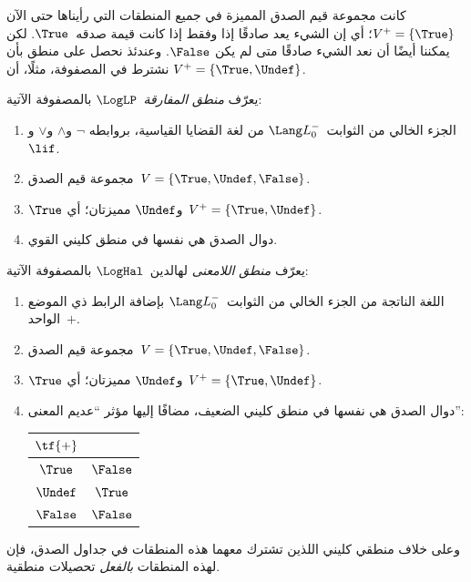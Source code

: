 \documentclass[../../../include/open-logic-section]{subfiles}
\begin{document}


كانت مجموعة قيم الصدق المميزة في جميع المنطقات التي رأيناها حتى الآن
$V^+ = \{\True\}$؛ أي إن الشيء يعد صادقًا إذا وفقط إذا كانت قيمة
صدقه~$\True$. لكن يمكننا أيضًا أن نعد الشيء صادقًا متى لم يكن
$\False$. وعندئذ نحصل على منطق بأن نشترط في المصفوفة، مثلًا، أن
$V^+ = \{\True, \Undef\}$.

\begin{defn}
يعرّف \emph{منطق المفارقة}~$\LogLP$ بالمصفوفة الآتية:
\begin{enumerate}
  \item الجزء الخالي من الثوابت~$\Lang L_0^{-}$ من لغة القضايا القياسية، بروابطه
  $\lnot$ و$\land$ و$\lor$ و$\lif$.
  \item مجموعة قيم الصدق~$V = \{\True, \Undef, \False\}$.
  \item $\True$ و$\Undef$ مميزتان؛ أي~$V^+ = \{\True, \Undef\}$.
  \item دوال الصدق هي نفسها في منطق كليني القوي.
\end{enumerate}
\end{defn}

\begin{defn}
يعرّف \emph{منطق اللامعنى} لهالدين~$\LogHal$ بالمصفوفة الآتية:
\begin{enumerate}
  \item اللغة الناتجة من الجزء الخالي من الثوابت~$\Lang L_0^{-}$
  بإضافة الرابط ذي الموضع الواحد~$+$.
  \item مجموعة قيم الصدق~$V = \{\True, \Undef, \False\}$.
  \item $\True$ و$\Undef$ مميزتان؛ أي~$V^+ = \{\True, \Undef\}$.
  \item دوال الصدق هي نفسها في منطق كليني الضعيف، مضافًا إليها مؤثر
  ``عديم المعنى'':
  \begin{center}
    \begin{tabular}{c|c}
    $\tf{+}$ & \\
    \hline
    $\True$ & $\False$ \\
    $\Undef$ & $\True$ \\
    $\False$ & $\False$
    \end{tabular}
  \end{center}
\end{enumerate}
\end{defn}

وعلى خلاف منطقي كليني اللذين تشترك معهما هذه المنطقات في جداول الصدق،
فإن لهذه المنطقات \emph{بالفعل} تحصيلات منطقية.
\end{document}
